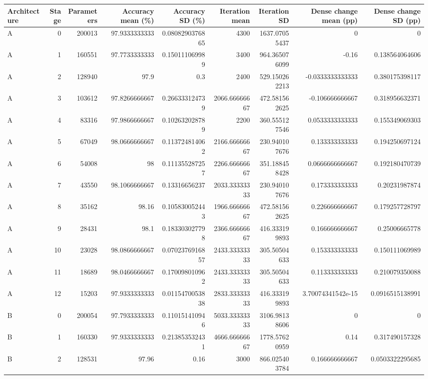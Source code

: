\begin{tabular}{lrrrrrrrr}
\toprule
Architecture & Stage & Parameters & Accuracy mean (\%) & Accuracy SD (\%) & Iteration mean & Iteration SD & Dense change mean (pp) & Dense change SD (pp) \\
\midrule
A & 0 & 200013 & 97.9333333333 & 0.0808290376865 & 4300 & 1637.07055437 & 0 & 0 \\
A & 1 & 160551 & 97.7733333333 & 0.150111069989 & 3400 & 964.365076099 & -0.16 & 0.138564064606 \\
A & 2 & 128940 & 97.9 & 0.3 & 2400 & 529.150262213 & -0.0333333333333 & 0.380175398117 \\
A & 3 & 103612 & 97.8266666667 & 0.266333124739 & 2066.66666667 & 472.581562625 & -0.106666666667 & 0.318956632371 \\
A & 4 & 83316 & 97.9866666667 & 0.102632028789 & 2200 & 360.555127546 & 0.0533333333333 & 0.155349069303 \\
A & 5 & 67049 & 98.0666666667 & 0.113724814062 & 2166.66666667 & 230.940107676 & 0.133333333333 & 0.194250697124 \\
A & 6 & 54008 & 98 & 0.111355287257 & 2266.66666667 & 351.188458428 & 0.0666666666667 & 0.192180470739 \\
A & 7 & 43550 & 98.1066666667 & 0.13316656237 & 2033.33333333 & 230.940107676 & 0.173333333333 & 0.20231987874 \\
A & 8 & 35162 & 98.16 & 0.105830052443 & 1966.66666667 & 472.581562625 & 0.226666666667 & 0.179257728797 \\
A & 9 & 28431 & 98.1 & 0.183303027798 & 2366.66666667 & 416.333199893 & 0.166666666667 & 0.25006665778 \\
A & 10 & 23028 & 98.0866666667 & 0.0702376916857 & 2433.33333333 & 305.50504633 & 0.153333333333 & 0.150111069989 \\
A & 11 & 18689 & 98.0466666667 & 0.170098010962 & 2433.33333333 & 305.50504633 & 0.113333333333 & 0.210079350088 \\
A & 12 & 15203 & 97.9333333333 & 0.0115470053838 & 2833.33333333 & 416.333199893 & 3.70074341542e-15 & 0.0916515138991 \\
B & 0 & 200054 & 97.7933333333 & 0.110151410946 & 5033.33333333 & 3106.98138606 & 0 & 0 \\
B & 1 & 160330 & 97.9333333333 & 0.213853532431 & 4666.66666667 & 1778.57620959 & 0.14 & 0.317490157328 \\
B & 2 & 128531 & 97.96 & 0.16 & 3000 & 866.025403784 & 0.166666666667 & 0.0503322295685 \\

\end{tabular}
